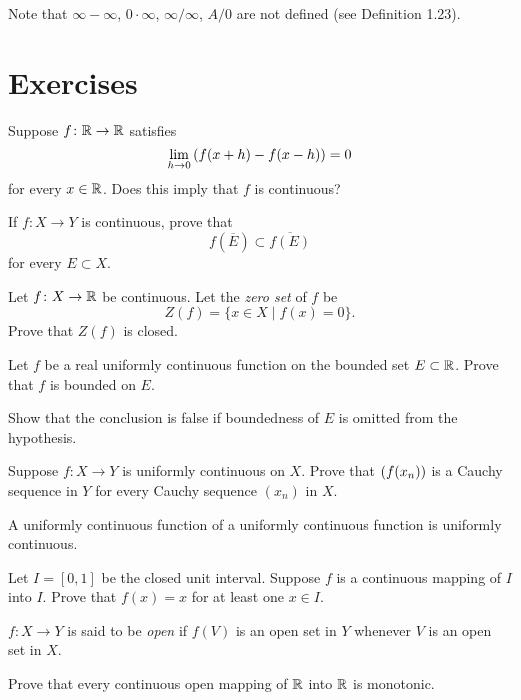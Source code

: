 Note that $\infty-\infty$, $0\cdot\infty$, $\infty/\infty$, $A/0$ are not defined (see Definition 1.23). 
\pagebreak

\section*{Exercises}
\begin{exercise}
Suppose $f\colon \mathbb R\to\mathbb R$ satisfies
\[\lim_{h\to0}\left(f(x+h)-f(x-h)\right)=0\]
for every $x\in\mathbb R$. Does this imply that $f$ is continuous?
\end{exercise}

\begin{exercise}
If $f\colon X\to Y$ is continuous, prove that
\[f(\overline{E})\subset\overline{f(E)}\]
for every $E\subset X$.
\end{exercise}

\begin{exercise}
Let $f\colon X\to\mathbb R$ be continuous. Let the \emph{zero set} of $f$ be
\[Z(f)=\{x\in X\mid f(x)=0\}.\]
Prove that $Z(f)$ is closed.
\end{exercise}

\begin{exercise}
Let $f$ be a real uniformly continuous function on the bounded set $E\subset\mathbb R$. Prove that $f$ is bounded on $E$.

Show that the conclusion is false if boundedness of $E$ is omitted from the hypothesis.
\end{exercise}

\begin{exercise}
Suppose $f\colon X\to Y$ is uniformly continuous on $X$. Prove that $\left(f(x_n)\right)$ is a Cauchy sequence in $Y$ for every Cauchy sequence $(x_n)$ in $X$.
\end{exercise}

\begin{exercise}
A uniformly continuous function of a uniformly continuous function is uniformly continuous.
\end{exercise}

\begin{exercise}
Let $I=[0,1]$ be the closed unit interval. Suppose $f$ is a continuous mapping of $I$ into $I$. Prove that $f(x)=x$ for at least one $x\in I$. 
\end{exercise}

\begin{exercise}
$f\colon X\to Y$ is said to be \emph{open} if $f(V)$ is an open set in $Y$ whenever $V$ is an open set in $X$.

Prove that every continuous open mapping of $\mathbb R$ into $\mathbb R$ is monotonic.
\end{exercise}

